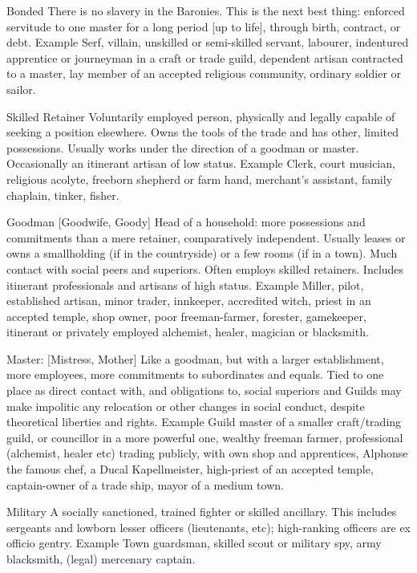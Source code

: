 \documentclass[a4paper]{article}
\begin{document}
\begin{multicols}{3}
Bonded There is no slavery in the Baronies. This is
the next best thing: enforced servitude to one master for a long period [up to life], through birth,
contract, or debt.
Example
Serf, villain, unskilled or semi-skilled
servant, labourer, indentured apprentice or journeyman in
a craft or trade guild, dependent artisan contracted to a
master, lay member of an accepted religious community,
ordinary soldier or sailor.

Skilled Retainer Voluntarily employed person,
physically and legally capable of seeking a position
elsewhere. Owns the tools of the trade and has
other, limited possessions. Usually works under the
direction of a goodman or master. Occasionally an
itinerant artisan of low status.
Example
Clerk, court musician, religious acolyte,
freeborn shepherd or farm hand, merchant’s assistant,
family chaplain, tinker, fisher.

Goodman [Goodwife, Goody] Head of a household: more possessions and commitments than a
mere retainer, comparatively independent. Usually
leases or owns a smallholding (if in the countryside) or a few rooms (if in a town). Much contact
with social peers and superiors. Often employs
skilled retainers. Includes itinerant professionals
and artisans of high status.
Example
Miller, pilot, established artisan, minor
trader, innkeeper, accredited witch, priest in an accepted
temple, shop owner, poor freeman-farmer, forester, gamekeeper, itinerant or privately employed alchemist, healer,
magician or blacksmith.

Master: [Mistress, Mother] Like a goodman, but
with a larger establishment, more employees, more
commitments to subordinates and equals. Tied to
one place as direct contact with, and obligations to,
social superiors and Guilds may make impolitic
any relocation or other changes in social conduct,
despite theoretical liberties and rights.
Example
Guild master of a smaller craft/trading
guild, or councillor in a more powerful one, wealthy
freeman farmer, professional (alchemist, healer etc) trading publicly, with own shop and apprentices, Alphonse the
famous chef, a Ducal Kapellmeister, high-priest of an
accepted temple, captain-owner of a trade ship, mayor of a
medium town.

Military A socially sanctioned, trained fighter or
skilled ancillary. This includes sergeants and lowborn lesser officers (lieutenants, etc); high-ranking
officers are ex officio gentry.
Example
Town guardsman, skilled scout or military
spy, army blacksmith, (legal) mercenary captain.


\end{multicols}
\end{document}
